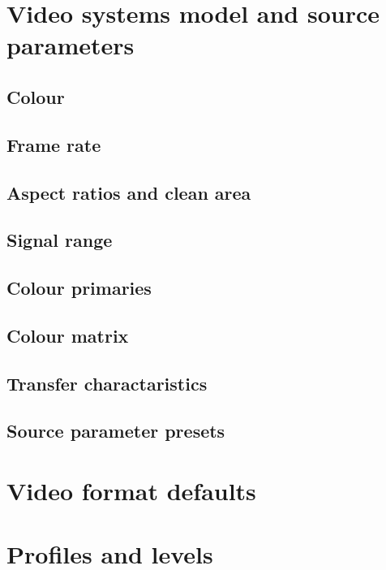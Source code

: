 \section{Video systems model and source parameters}

\label{vidsys}
\begin{informative*}
\subsection{Colour}
\subsection{Frame rate}
\subsection{Aspect ratios and clean area}
\subsection{Signal range}
\subsection{Colour primaries}
\subsection{Colour matrix}
\subsection{Transfer charactaristics}
\end{informative*}
\subsection{Source parameter presets}

\clearpage
\section{Video format defaults}

\clearpage
\section{Profiles and levels}\label{profilelevel}
